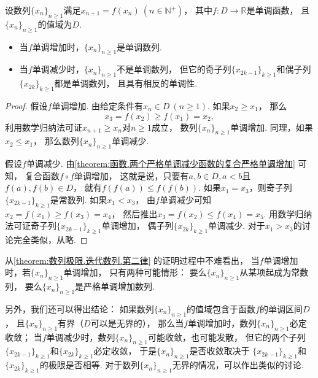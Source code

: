 \begin{proposition}\label{theorem:数列极限.迭代数列.第二律}
设数列\(\{x_n\}_{n\geq1}\)满足\(x_{n+1} = f(x_n)\ (n\in\mathbb{N}^+)\)，
其中\(f\colon D\to\mathbb{R}\)是单调函数，
且\(\{x_n\}_{n\geq1}\)的值域为\(D\).
\begin{itemize}
	\item 当\(f\)单调增加时，\(\{x_n\}_{n\geq1}\)是单调数列.
	\item 当\(f\)单调减少时，\(\{x_n\}_{n\geq1}\)不是单调数列，
	但它的奇子列\(\{x_{2k-1}\}_{k\geq1}\)和偶子列\(\{x_{2k}\}_{k\geq1}\)都是单调数列，
	且具有相反的单调性.
\end{itemize}
\begin{proof}
假设\(f\)单调增加.
由给定条件有\(x_n \in D\ (n\geq1)\).
如果\(x_2 \geq x_1\)，
那么\[
	x_3 = f(x_2) \geq f(x_1) = x_2,
\]
利用数学归纳法可证\(x_{n+1} \geq x_n\)对\(n\geq1\)成立，
数列\(\{x_n\}_{n\geq1}\)单调增加.
同理，如果\(x_2 \leq x_1\)，
那么数列\(\{x_n\}_{n\geq1}\)单调减少.

假设\(f\)单调减少.
由\cref{theorem:函数.两个严格单调减少函数的复合严格单调增加} 可知，
复合函数\(f \circ f\)单调增加，
这就是说，只要有\(a,b \in D, a<b\)且\(f(a),f(b) \in D\)，
就有\(f(f(a)) \leq f(f(b))\).
如果\(x_1 = x_3\)，则奇子列\(\{x_{2k-1}\}_{k\geq1}\)是常数列.
如果\(x_1 < x_3\)，
由\(f\)单调减少可知\(x_2 = f(x_1) \geq f(x_3) = x_4\)，
然后推出\(x_3 = f(x_2) \leq f(x_4) = x_5\).
用数学归纳法可证奇子列\(\{x_{2k-1}\}_{k\geq1}\)单调增加，
偶子列\(\{x_{2k}\}_{k\geq1}\)单调减少.
对于\(x_1>x_3\)的讨论完全类似，从略.
\end{proof}
\end{proposition}
\begin{remark}
从\cref{theorem:数列极限.迭代数列.第二律} 的证明过程中不难看出，
当\(f\)单调增加时，若\(\{x_n\}_{n\geq1}\)单调增加，
只有两种可能情形：
要么\(\{x_n\}_{n\geq1}\)从某项起成为常数列，
要么\(\{x_n\}_{n\geq1}\)是严格单调增加数列.

另外，我们还可以得出结论：
如果数列\(\{x_n\}_{n\geq1}\)的值域包含于函数\(f\)的单调区间\(D\)，
且\(\{x_n\}_{n\geq1}\)有界（\(D\)可以是无界的），
那么当\(f\)单调增加时，数列\(\{x_n\}_{n\geq1}\)必定收敛；
当\(f\)单调减少时，数列\(\{x_n\}_{n\geq1}\)可能收敛，也可能发散，
但它的两个子列\(\{x_{2k-1}\}_{k\geq1}\)和\(\{x_{2k}\}_{k\geq1}\)必定收敛，
于是\(\{x_n\}_{n\geq1}\)是否收敛取决于
\(\{x_{2k-1}\}_{k\geq1}\)和\(\{x_{2k}\}_{k\geq1}\)的极限是否相等.
对于数列\(\{x_n\}_{n\geq1}\)无界的情况，可以作出类似的讨论.
\end{remark}

